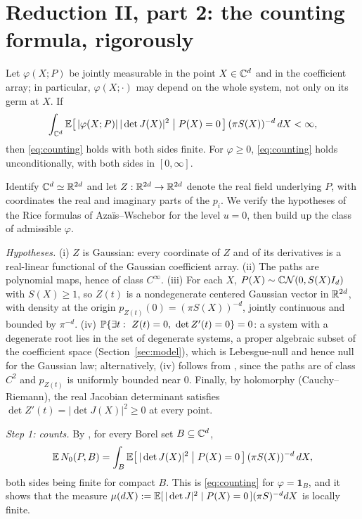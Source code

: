 \section{Reduction II, part 2: the counting formula, rigorously}\label{sec:counting}

\begin{lemma}\label{lem:rice}
  Let $\varphi(X;P)$ be jointly measurable in the point $X\in\C^d$ and in the coefficient
  array; in particular, $\varphi(X;\cdot)$ may depend on the whole system, not only on its
  germ at $X$. If
  \begin{equation}\label{eq:integrability}
    \int_{\C^d}\E\bigl[\,|\varphi(X;P)|\,|\det J(X)|^2 \bigm| P(X)=0\,\bigr]\,
    (\pi S(X))^{-d}\,dX < \infty,
  \end{equation}
  then \eqref{eq:counting} holds with both sides finite. For $\varphi\ge0$,
  \eqref{eq:counting} holds unconditionally, with both sides in $[0,\infty]$.
\end{lemma}

\proof
Identify $\C^d\simeq\R^{2d}$ and let $Z:\R^{2d}\to\R^{2d}$ denote the real field underlying
$P$, with coordinates the real and imaginary parts of the $p_i$. We verify the hypotheses of
the Rice formulas of Aza\"is--Wschebor \cite[Thms.~6.2 and~6.4]{azais2009level} for the
level $u=0$, then build up the class of admissible $\varphi$.

\emph{Hypotheses.} (i) $Z$ is Gaussian: every coordinate of $Z$ and of its derivatives is a
real-linear functional of the Gaussian coefficient array. (ii) The paths are polynomial
maps, hence of class $C^\infty$. (iii) For each $X$, $P(X)\sim\CN(0,S(X)I_d)$ with
$S(X)\ge1$, so $Z(t)$ is a nondegenerate centered Gaussian vector in $\R^{2d}$, with
density at the origin $p_{Z(t)}(0) = (\pi S(X))^{-d}$, jointly continuous and bounded by
$\pi^{-d}$. (iv) $\P\{\exists t:\ Z(t)=0,\ \det Z'(t)=0\}=0$: a system with a degenerate
root lies in the set of degenerate systems, a proper algebraic subset of the coefficient
space (Section~\ref{sec:model}), which is Lebesgue-null and hence null for the Gaussian
law; alternatively, (iv) follows from \cite[Prop.~6.5, condition~(a)]{azais2009level},
since the paths are of class $C^2$ and $p_{Z(t)}$ is uniformly bounded near $0$. Finally,
by holomorphy (Cauchy--Riemann), the real Jacobian determinant satisfies
$\det Z'(t) = |\det J(X)|^2\ge0$ at every point.

\emph{Step 1: counts.} By \cite[Thm.~6.2]{azais2009level}, for every Borel set
$B\subseteq\C^d$,
\[
  \E\,N_0(P,B) = \int_B\E\bigl[\,|\det J(X)|^2 \bigm| P(X)=0\,\bigr]\,
  (\pi S(X))^{-d}\,dX,
\]
both sides being finite for compact $B$. This is \eqref{eq:counting} for
$\varphi=\mathbf1_B$, and it shows that the measure
$\mu(dX) := \E[\,|\det J|^2\mid P(X)=0\,](\pi S)^{-d}dX$ is locally finite.

